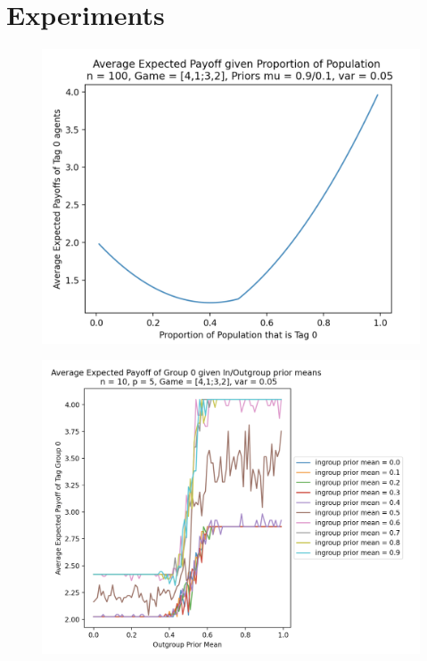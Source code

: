 \documentclass[]{llncs}
\begin{document}
\section{Experiments}
\begin{figure}
\centering
\includegraphics[width=12cm]{images/p_experiment}
\end{figure}

\begin{figure}
\centering
\includegraphics[width=12cm]{images/prior_experiment}
\end{figure}
\end{document}
